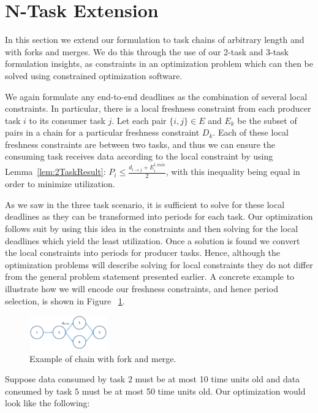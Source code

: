 \section{N-Task Extension}

In this section we extend our formulation to task chains of arbitrary length and with forks and merges. We do this through the use of our 2-task and 3-task formulation insights, as constraints in an optimization problem which can then be solved using constrained optimization software.

We again formulate any end-to-end deadlines as the combination of several local constraints. In particular, there is a local freshness constraint from each producer task $i$ to its consumer task $j$. Let each pair $\{i,j\} \in E$ and $E_k$ be the subset of pairs in a chain for a particular freshness constraint $D_k$. Each of these local freshness constraints are between two tasks, and thus we can ensure the consuming task receives data according to the local constraint by using Lemma~\ref{lem:2TaskResult}: $P_i \leq \frac{d_{i \to j} + E^{l,min}_i}{2}$, with this inequality being equal in order to minimize utilization.

As we saw in the three task scenario, it is sufficient to solve for these local deadlines as they can be transformed into periods for each task. Our optimization follows suit by using this idea in the constraints and then solving for the local deadlines which yield the least utilization. Once a solution is found we convert the local constraints into periods for producer tasks. Hence, although the optimization problems will describe solving for local constraints they do not differ from the general problem statement presented earlier. A concrete example to illustrate how we will encode our freshness constraints, and hence period selection, is shown in Figure ~\ref{fig:fork-merge}.

\begin{figure}[!ht]
	\centering
	\includegraphics[width=0.3\textwidth]{figures/fork-merge}
	\caption{Example of chain with fork and merge.}
	\label{fig:fork-merge}
\end{figure}

Suppose data consumed by task $2$ must be at most 10 time units old and data consumed by task $5$ must be at most 50 time units old. Our optimization would look like the following:


